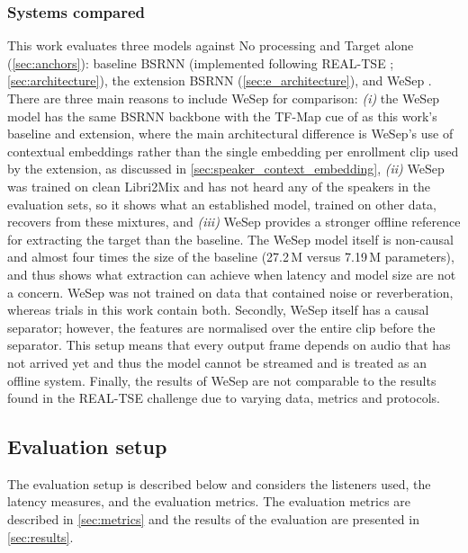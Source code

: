  \subsubsection{Systems compared}
  \label{exp:systems}
    This work evaluates three models against No processing and Target alone (\autoref{sec:anchors}): baseline BSRNN (implemented following REAL-TSE \cite{wang2026realtse}; \autoref{sec:architecture}), the extension BSRNN (\autoref{sec:e_architecture}), and WeSep \cite{wang2024wesep}. There are three main reasons to include WeSep for comparison: \textit{(i)} the WeSep model has the same BSRNN backbone with the TF-Map cue of \cite{zhang2025multi} as this work's baseline and extension, where the main architectural difference is WeSep's use of contextual embeddings rather than the single embedding per enrollment clip used by the extension, as discussed in \autoref{sec:speaker_context_embedding}, \textit{(ii)} WeSep was trained on clean Libri2Mix \cite{cosentino2020librimix} and has not heard any of the speakers in the evaluation sets, so it shows what an established model, trained on other data, recovers from these mixtures, and \textit{(iii)} WeSep provides a stronger offline reference for extracting the target than the baseline. The WeSep model itself is non-causal and almost four times the size of the baseline (27.2\,M versus 7.19\,M parameters), and thus shows what extraction can achieve when latency and model size are not a concern. WeSep was not trained on data that contained noise or reverberation, whereas trials in this work contain both. Secondly, WeSep itself has a causal separator; however, the features are normalised over the entire clip before the separator. This setup means that every output frame depends on audio that has not arrived yet and thus the model cannot be streamed and is treated as an offline system. Finally, the results of WeSep are not comparable to the results found in the REAL-TSE challenge \cite{wang2026realtse} due to varying data, metrics and protocols. 

 


 \subsection{Evaluation setup}
 The evaluation setup is described below and considers the listeners used, the latency measures, and the evaluation metrics. The evaluation metrics are described in \autoref{sec:metrics} and the results of the evaluation are presented in \autoref{sec:results}.
